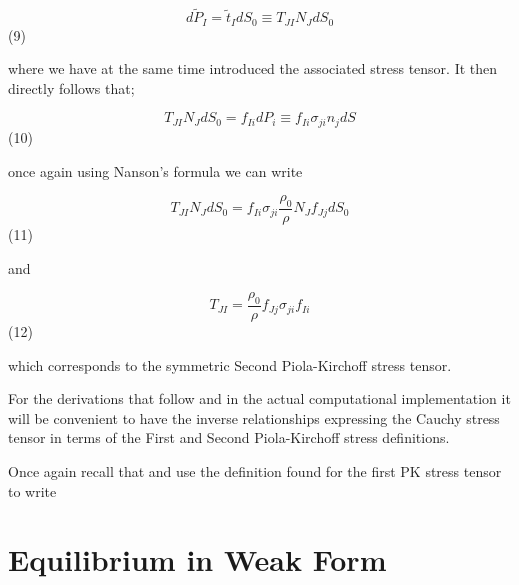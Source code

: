 \begin{equation}
d{\tilde P_I} = {\tilde t_I}d{S_0} \equiv {T_{JI}}{N_J}d{S_0}
\label{unde tracts 1}
\end{equation}	 								(9)

where we have at the same time introduced the associated stress tensor.  It then directly follows that;

\begin{equation}
{T_{JI}}{N_J}d{S_0} = {f_{Ii}}d{P_i} \equiv {f_{Ii}}{\sigma _{ji}}{n_j}dS
\label{unde tracts 2}	 
\end{equation}							(10)

once again using Nanson's formula we can write

\begin{equation}
{T_{JI}}{N_J}d{S_0} = {f_{Ii}}{\sigma _{ji}}\frac{{{\rho _0}}}{\rho }{N_J}{f_{Jj}}d{S_0}
\label{unde tracts 3}
\end{equation}	 							(11)

and

\begin{equation}
{T_{JI}} = \frac{{{\rho _0}}}{\rho }{f_{Jj}}{\sigma _{ji}}{f_{Ii}}
\label{unde tracts 4}
\end{equation}	 								(12)

which corresponds to the symmetric Second Piola-Kirchoff stress tensor.

For the derivations that follow and in the actual computational implementation it will be convenient to have the inverse relationships expressing the Cauchy stress tensor in terms of the First and Second Piola-Kirchoff stress definitions.

Once again recall that   and use the definition found for the first PK stress tensor to write



\section{Equilibrium in Weak Form}
